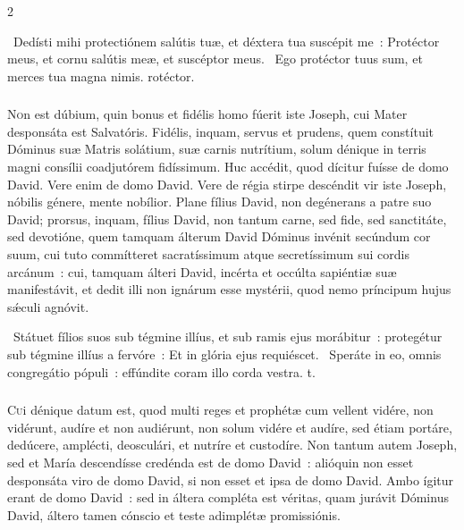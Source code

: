 \documentclass[9pt,twoside]{extarticle}
\begin{document}
\begin{multicols}{2}
{{{\begin{tightlist}{}
\item {}~Dedísti mihi protectiónem salútis tuæ, et déxtera tua suscépit me~: \textred{*} Protéctor meus, et cornu salútis meæ, et suscéptor meus. ~Ego protéctor tuus sum, et merces tua magna nimis. rotéctor.
\end{tightlist}

\subsubsection*{\center {}}
\lettrine{N}on est dúbium, quin bonus et fidélis homo fúerit iste Joseph, cui Mater desponsáta est Salvatóris. Fidélis, inquam, servus et prudens, quem constítuit Dóminus suæ Matris solátium, suæ carnis nutrítium, solum dénique in terris magni consílii coadjutórem fidíssimum. Huc accédit, quod dícitur fuísse de domo David. Vere enim de domo David. Vere de régia stirpe descéndit vir iste Joseph, nóbilis génere, mente nobílior. Plane fílius David, non degénerans a patre suo David; prorsus, inquam, fílius David, non tantum carne, sed fide, sed sanctitáte, sed devotióne, quem tamquam álterum David Dóminus invénit secúndum cor suum, cui tuto commítteret sacratíssimum atque secretíssimum sui cordis arcánum~: cui, tamquam álteri David, incérta et occúlta sapiéntiæ suæ manifestávit, et dedit illi non ignárum esse mystérii, quod nemo príncipum hujus sǽculi agnóvit.

\begin{tightlist}{}
\item {}~Státuet fílios suos sub tégmine illíus, et sub ramis ejus morábitur~: protegétur sub tégmine illíus a fervóre~: \textred{*} Et in glória ejus requiéscet. ~Speráte in eo, omnis congregátio pópuli~: effúndite coram illo corda vestra. t.
\end{tightlist}

\subsubsection*{\center {}}
\lettrine{C}ui dénique datum est, quod multi reges et prophétæ cum vellent vidére, non vidérunt, audíre et non audiérunt, non solum vidére et audíre, sed étiam portáre, dedúcere, amplécti, deosculári, et nutríre et custodíre. Non tantum autem Joseph, sed et María descendísse credénda est de domo David~: alióquin non esset desponsáta viro de domo David, si non esset et ipsa de domo David. Ambo ígitur erant de domo David~: sed in áltera compléta est véritas, quam jurávit Dóminus David, áltero tamen cónscio et teste adimplétæ promissiónis.

}}}
\end{multicols}
\end{document}
